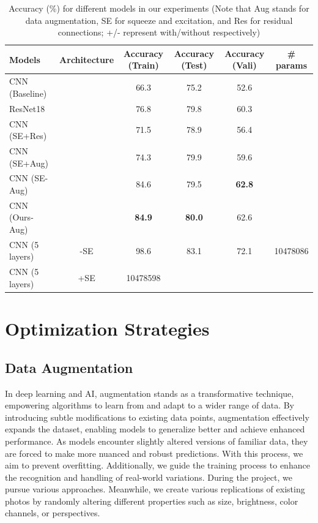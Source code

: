 \begin{table}[ht]
  \centering
  \begin{tabular}{@{}lccccc@{}}
    \toprule 
    Models & Architecture &  Accuracy (Train) &  Accuracy (Test) & Accuracy (Vali) & \# params \\
    \midrule
    CNN (Baseline) & & 66.3 & 75.2 & 52.6 & \\
    ResNet18~\cite{HeZRS16} & & 76.8 & 79.8 & 60.3 & \\
    CNN (SE+Res) & & 71.5 & 78.9 & 56.4 & \\
    CNN (SE+Aug) & & 74.3 & 79.9 & 59.6 & \\
    CNN (SE-Aug) & & 84.6 & 79.5 & \textbf{62.8} & \\
    CNN (Ours-Aug) & & \textbf{84.9} & \textbf{80.0} & 62.6 & \\
    CNN (5 layers) & -SE & 98.6 & 83.1 & 72.1 & 10478086 \\
    CNN (5 layers) & +SE & 10478598 \\
    \bottomrule
  \end{tabular}
  \caption{Accuracy (\%) for different models in our experiments 
  (Note that Aug stands for data augmentation, SE for squeeze and excitation, and Res for residual connections; 
  +/- represent with/without respectively)}
  \label{tab:model}
\end{table}

\section{Optimization Strategies}
\label{sec:optim}


\subsection{Data Augmentation}
\label{sec:optim:aug}

In deep learning and AI, %
augmentation stands as a transformative technique, 
empowering algorithms to learn from and adapt to a wider range of data. 
By introducing subtle modifications to existing data points, 
augmentation effectively expands the dataset, 
enabling models to generalize better and achieve enhanced performance. 
As models encounter slightly altered versions of familiar data, 
they are forced to make more nuanced and robust predictions. 
With this process, we aim to prevent overfitting. %
Additionally, we guide the training process to enhance the recognition and handling of real-world variations.
During the project, we pursue various approaches. 
Meanwhile, we create various replications of existing photos by randomly altering different properties such as size, brightness, color channels, or perspectives.


